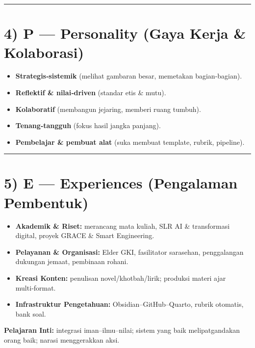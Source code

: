 \documentclass[
  letterpaper,
  DIV=11,
  numbers=noendperiod]{scrreprt}
\providecommand{\tightlist}{%
  \setlength{\itemsep}{0pt}\setlength{\parskip}{0pt}}\usepackage{longtable,booktabs,array}
\begin{document}
\begin{center}\rule{0.5\linewidth}{0.5pt}\end{center}

\section{4) P --- Personality (Gaya Kerja \&
Kolaborasi)}\label{p-personality-gaya-kerja-kolaborasi}

\begin{itemize}
\tightlist
\item
  \textbf{Strategis‑sistemik} (melihat gambaran besar, memetakan
  bagian-bagian).
\item
  \textbf{Reflektif \& nilai‑driven} (standar etis \& mutu).
\item
  \textbf{Kolaboratif} (membangun jejaring, memberi ruang tumbuh).
\item
  \textbf{Tenang‑tangguh} (fokus hasil jangka panjang).
\item
  \textbf{Pembelajar \& pembuat alat} (suka membuat template, rubrik,
  pipeline).
\end{itemize}

\begin{center}\rule{0.5\linewidth}{0.5pt}\end{center}

\section{5) E --- Experiences (Pengalaman
Pembentuk)}\label{e-experiences-pengalaman-pembentuk}

\begin{itemize}
\tightlist
\item
  \textbf{Akademik \& Riset:} merancang mata kuliah, SLR AI \&
  transformasi digital, proyek GRACE \& Smart Engineering.
\item
  \textbf{Pelayanan \& Organisasi:} Elder GKI, fasilitator sarasehan,
  penggalangan dukungan jemaat, pembinaan rohani.
\item
  \textbf{Kreasi Konten:} penulisan novel/khotbah/lirik; produksi materi
  ajar multi‑format.
\item
  \textbf{Infrastruktur Pengetahuan:} Obsidian--GitHub--Quarto, rubrik
  otomatis, bank soal.
\end{itemize}

\textbf{Pelajaran Inti:} integrasi iman--ilmu--nilai; sistem yang baik
melipatgandakan orang baik; narasi menggerakkan aksi.
\end{document}

